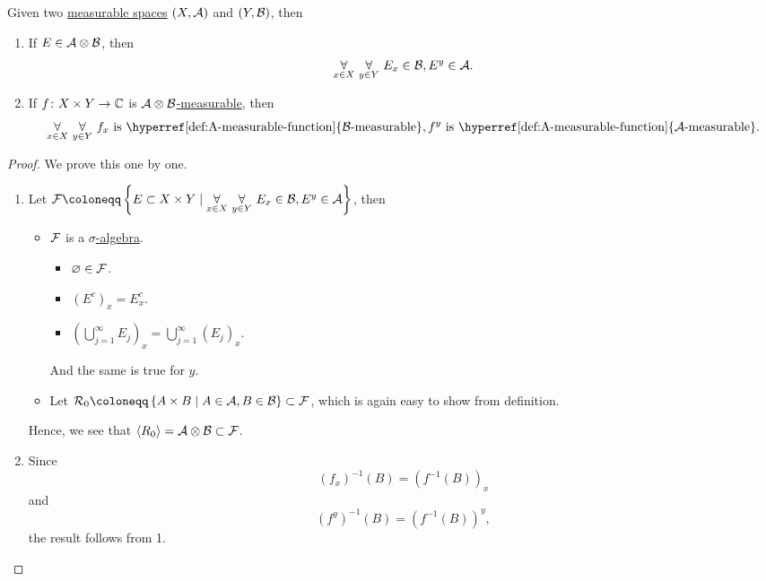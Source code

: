 \begin{proposition}
  Given two \hyperref[def:measurable-space]{measurable spaces} \((X, \mathcal{\MakeUppercase{a}} )\) and \((Y, \mathcal{\MakeUppercase{b}} )\), then
  \begin{enumerate}
    \item If \(E\in \mathcal{\MakeUppercase{a}} \otimes \mathcal{\MakeUppercase{b}}\), then
          \[
            \underset{x\in X}{\forall }\ \underset{y\in Y}{\forall }\ E_x\in \mathcal{\MakeUppercase{b}} , E^y\in \mathcal{\MakeUppercase{a}}.
          \]
    \item If \(f\colon X\times Y\to \mathbb{\MakeUppercase{c}} \) is \hyperref[def:A-measurable-function]{\(\mathcal{\MakeUppercase{a}} \otimes \mathcal{\MakeUppercase{b}} \)-measurable}, then
          \[
            \underset{x\in X}{\forall }\ \underset{y\in Y}{\forall }\ f_x \text{ is \hyperref[def:A-measurable-function]{\(\mathcal{\MakeUppercase{b}}\)-measurable}}, f^y \text{ is \hyperref[def:A-measurable-function]{\(\mathcal{\MakeUppercase{a}}\)-measurable}}.
          \]
  \end{enumerate}
\end{proposition}
\begin{proof}
  We prove this one by one.
  \begin{enumerate}
    \item Let \(\mathcal{\MakeUppercase{f}} \coloneqq \left\{E\subset X\times Y \mid \underset{x\in X}{\forall }\ \underset{y\in Y}{\forall }\ E_x\in \mathcal{\MakeUppercase{b}} , E^y\in \mathcal{\MakeUppercase{a}}\right\}\), then
          \begin{itemize}
            \item \(\mathcal{\MakeUppercase{f}} \) is a \hyperref[def:sigma-algebra]{\(\sigma\)-algebra}.
                  \begin{itemize}
                    \item \(\varnothing \in \mathcal{\MakeUppercase{f}} \).
                    \item \((E^{c} )_x = E_{x}^{c}\).
                    \item \(\left(\bigcup\limits_{j=1}^{\infty} E_{j} \right)_x = \bigcup\limits_{j=1}^{\infty} (E_{j} )_{x} \).
                  \end{itemize}
                  And the same is true for \(y\).
            \item Let \(\mathcal{\MakeUppercase{r}} _0 \coloneqq \left\{A\times B \mid A\in \mathcal{\MakeUppercase{a}} , B\in \mathcal{\MakeUppercase{b}} \right\}\subset \mathcal{\MakeUppercase{f}}\), which is again
                  easy to show from definition.
          \end{itemize}
          Hence, we see that \(\left< R_0 \right> = \mathcal{\MakeUppercase{a}} \otimes \mathcal{\MakeUppercase{b}} \subset \mathcal{\MakeUppercase{f}} \).
    \item Since
          \[
            (f_{x} )^{-1} (B) = (f^{-1} (B))_{x}
          \]
          and
          \[
            (f^{y} )^{-1} ({B} ) = (f^{-1} (B))^{y},
          \]
          the result follows from 1.
  \end{enumerate}
\end{proof}

